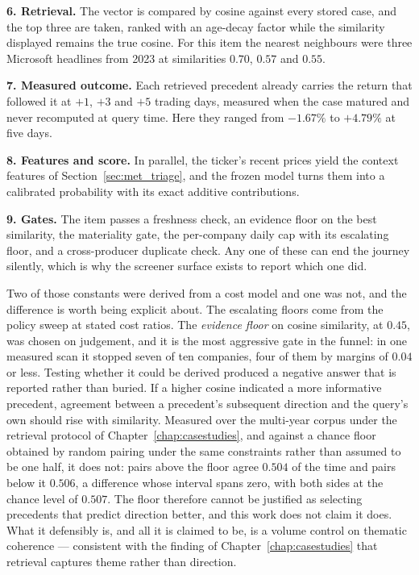 \textbf{6. Retrieval.} The vector is compared by cosine against every stored case, and the top three
are taken, ranked with an age-decay factor while the similarity displayed remains the true cosine. For
this item the nearest neighbours were three Microsoft headlines from 2023 at similarities $0.70$,
$0.57$ and $0.55$.

\textbf{7. Measured outcome.} Each retrieved precedent already carries the return that followed it at
$+1$, $+3$ and $+5$ trading days, measured when the case matured and never recomputed at query time.
Here they ranged from $-1.67\%$ to $+4.79\%$ at five days.

\textbf{8. Features and score.} In parallel, the ticker's recent prices yield the context features of
Section~\ref{sec:met_triage}, and the frozen model turns them into a calibrated probability with its
exact additive contributions.

\textbf{9. Gates.} The item passes a freshness check, an evidence floor on the best similarity, the
materiality gate, the per-company daily cap with its escalating floor, and a cross-producer duplicate
check. Any one of these can end the journey silently, which is why the screener surface exists to
report which one did.

Two of those constants were derived from a cost model and one was not, and the difference is worth
being explicit about. The escalating floors come from the policy sweep at stated cost ratios. The
\emph{evidence floor} on cosine similarity, at $0.45$, was chosen on judgement, and it is the most
aggressive gate in the funnel: in one measured scan it stopped seven of ten companies, four of them
by margins of $0.04$ or less. Testing whether it could be derived produced a negative answer that is
reported rather than buried. If a higher cosine indicated a more informative precedent, agreement
between a precedent's subsequent direction and the query's own should rise with similarity. Measured
over the multi-year corpus under the retrieval protocol of Chapter~\ref{chap:casestudies}, and
against a chance floor obtained by random pairing under the same constraints rather than assumed to
be one half, it does not: pairs above the floor agree $0.504$ of the time and pairs below it $0.506$,
a difference whose interval spans zero, with both sides at the chance level of $0.507$. The floor
therefore cannot be justified as selecting precedents that predict direction better, and this work
does not claim it does. What it defensibly is, and all it is claimed to be, is a volume control on
thematic coherence --- consistent with the finding of Chapter~\ref{chap:casestudies} that retrieval
captures theme rather than direction.

